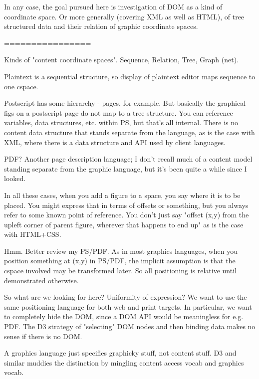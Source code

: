 \documentclass[12pt]{tufte-handout}
\numberwithin{equation}{subsection}
\numberwithin{equation}{subsection}
\begin{document}
  In any case, the goal pursued here is investigation of DOM as a kind
  of coordinate space.  Or more generally (covering XML as well as
  HTML), of tree structured data and their relation of graphic
  coordinate spaces.


  ================

  Kinds of "content coordinate spaces".  Sequence, Relation, Tree, Graph
  (net).

  Plaintext is a sequential structure, so display of plaintext editor
  maps sequence to one cspace.

  Postscript has some hierarchy - pages, for example.  But basically the
  graphical figs on a postscript page do not map to a tree structure.
  You can reference variables, data structures, etc. within PS, but
  that's all internal.  There is no content data structure that stands
  separate from the language, as is the case with XML, where there is a
  data structure and API used by client languages.

  PDF?  Another page description language; I don't recall much of a
  content model standing separate from the graphic language, but it's
  been quite a while since I looked.

  In all these cases, when you add a figure to a space, you say where it
  is to be placed.  You might express that in terms of offsets or
  something, but you always refer to some known point of reference.  You
  don't just say "offset (x,y) from the upleft corner of parent
  figure, wherever that happens to end up" as is the case with HTML+CSS.

  Hmm.  Better review my PS/PDF.  As in most graphics languages, when
  you position something at (x,y) in PS/PDF, the implicit assumption is
  that the cspace involved may be transformed later.  So all positioning
  is relative until demonstrated otherwise.

  So what are we looking for here?  Uniformity of expression?  We want
  to use the same positioning language for both web and print targets.
  In particular, we want to completely hide the DOM, since a DOM API
  would be meaningless for e.g. PDF.  The D3 strategy of "selecting" DOM
  nodes and then binding data makes no sense if there is no DOM.

  A graphics language just specifies graphicky stuff, not content stuff.
  D3 and similar muddies the distinction by mingling content access
  vocab and graphics vocab.
\end{document}
